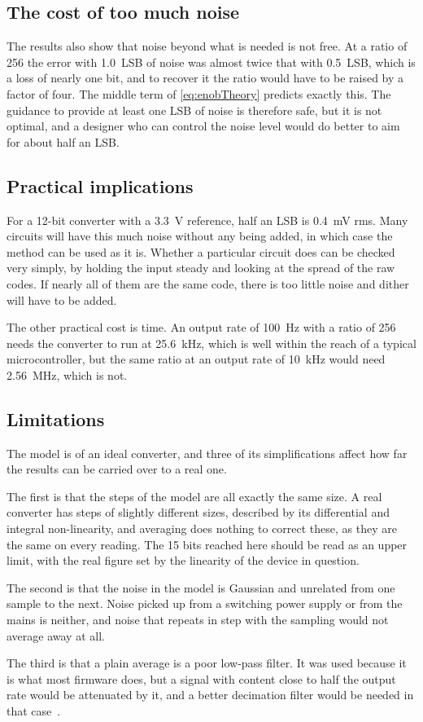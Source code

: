 \subsection{The cost of too much noise}

The results also show that noise beyond what is needed is not free. At a
ratio of 256 the error with \qty{1.0}{LSB} of noise was almost twice that
with \qty{0.5}{LSB}, which is a loss of nearly one bit, and to recover it the
ratio would have to be raised by a factor of four. The middle term of
\cref{eq:enobTheory} predicts exactly this. The guidance to provide at
least one LSB of noise is therefore safe, but it is not optimal, and a
designer who can control the noise level would do better to aim for about
half an LSB.

\subsection{Practical implications}

For a 12-bit converter with a \qty{3.3}{\volt} reference, half an LSB is
\qty{0.4}{\milli\volt} rms. Many circuits will have this much noise without
any being added, in which case the method can be used as it is. Whether a
particular circuit does can be checked very simply, by holding the input
steady and looking at the spread of the raw codes. If nearly all of them are
the same code, there is too little noise and dither will have to be added.

The other practical cost is time. An output rate of \qty{100}{\hertz} with a
ratio of 256 needs the converter to run at \qty{25.6}{\kilo\hertz}, which is
well within the reach of a typical microcontroller, but the same ratio at an
output rate of \qty{10}{\kilo\hertz} would need \qty{2.56}{\mega\hertz},
which is not.

\subsection{Limitations}

The model is of an ideal converter, and three of its simplifications affect
how far the results can be carried over to a real one.

The first is that the steps of the model are all exactly the same size. A
real converter has steps of slightly different sizes, described by its
differential and integral non-linearity, and averaging does nothing to
correct these, as they are the same on every reading. The 15 bits reached
here should be read as an upper limit, with the real figure set by the
linearity of the device in question.

The second is that the noise in the model is Gaussian and unrelated from one
sample to the next. Noise picked up from a switching power supply or from the
mains is neither, and noise that repeats in step with the sampling would not
average away at all.

The third is that a plain average is a poor low-pass filter. It was used
because it is what most firmware does, but a signal with content close to
half the output rate would be attenuated by it, and a better decimation
filter would be needed in that case~\cite{oppenheim_schafer_2010}.
